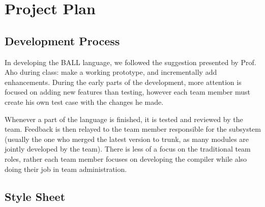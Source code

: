 \chapter{Project Plan}

\section{Development Process}\label{Process}

In developing the BALL language, we followed the suggestion presented
by Prof. Aho during class: make a working prototype, and incrementally
add enhancements. During the early parts of the development, more
attention is focused on adding new features than testing, however each
team member must create his own test case with the changes he made.

Whenever a part of the language is finished, it is tested and reviewed
by the team. Feedback is then relayed to the team member responsible
for the subsystem (usually the one who merged the latest version to
trunk, as many modules are jointly developed by the team). There is
less of a focus on the traditional team roles, rather each team member
focuses on developing the compiler while also doing their job in team
administration.

\pagebreak
\section{Style Sheet}\label{Style}

